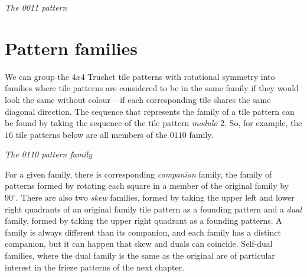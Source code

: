 \documentclass{tufte-book}
\begin{document}
\vspace{2cm}

\begin{center}
{

\textit{The 0011 pattern}
}
\end{center}

\chapter{Pattern families}

\noindent
We can group the $4x4$ Truchet tile patterns with rotational symmetry into families where  tile patterns are considered to be in the same family if they would look the same without colour -- if each corresponding tile shares the same diagonal direction. The sequence that represents the family of a tile pattern can be found by taking the sequence of the tile pattern \textit{modulo} $2$. So, for example, the $16$ tile patterns below are all members of the $0110$ family. 

\vspace{1.2cm}


{
\setlength{\tabcolsep}{3pt}
\renewcommand{\arraystretch}{2}

{\begin{center} \textit{The 0110 pattern family}\end{center}}
}


For a given family, there is corresponding \textit{companion} family, the family of patterns formed by rotating each square in a member of the original family by $90^{\circ}$.  There are also two \textit{skew} families, formed by taking the upper left and lower right quadrants of an original family tile pattern as a founding pattern and a \textit{dual} family, formed by taking the upper right quadrant as a founding patterns. A family is always different than its companion, and each family has a distinct companion, but it can happen that skew and duals can coincide. Self-dual families, where the dual family is the same as the original are of particular interest in the frieze patterns of the next chapter.
\end{document}
